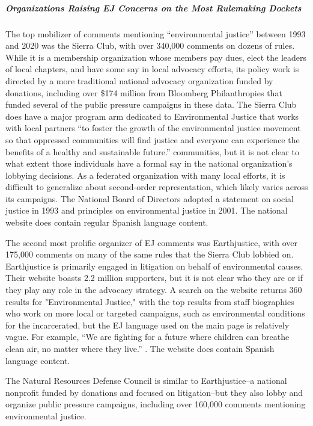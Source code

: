 \documentclass[
      12pt,
        ]{article}
\begin{document}
\hypertarget{organizations-raising-ej-concerns-on-the-most-rulemaking-dockets}{%
\subparagraph{Organizations Raising EJ Concerns on the Most Rulemaking Dockets}\label{organizations-raising-ej-concerns-on-the-most-rulemaking-dockets}}

The top mobilizer of comments mentioning ``environmental justice'' between 1993 and 2020 was the Sierra Club, with over 340,000 comments on dozens of rules. While it is a membership organization whose members pay dues, elect the leaders of local chapters, and have some say in local advocacy efforts, its policy work is directed by a more traditional national advocacy organization funded by donations, including over \$174 million from Bloomberg Philanthropies that funded several of the public pressure campaigns in these data. The Sierra Club does have a major program arm dedicated to Environmental Justice that works with local partners ``to foster the growth of the environmental justice movement so that oppressed communities will find justice and everyone can experience the benefits of a healthy and sustainable future.'' communities, but it is not clear to what extent those individuals have a formal say in the national organization's lobbying decisions. As a federated organization with many local efforts, it is difficult to generalize about second-order representation, which likely varies across its campaigns. The National Board of Directors adopted a statement on social justice in 1993 and principles on environmental justice in 2001. The national website does contain regular Spanish language content.

The second most prolific organizer of EJ comments was Earthjustice, with over 175,000 comments on many of the same rules that the Sierra Club lobbied on. Earthjustice is primarily engaged in litigation on
behalf of environmental causes. Their website boasts 2.2 million
supporters, but it is not clear who they are or if they play any role in
the advocacy strategy. A search on the website returns 360 results for
"Environmental Justice," with the top results from staff biographies
who work on more local or targeted campaigns, such as environmental conditions
for the incarcerated, but the EJ language used on the
main page is relatively vague. For example, ``We are fighting for a future
where children can breathe clean air, no matter where they live.''
\citep{Earthjustice2017}. The website does contain Spanish language content.

The Natural Resources Defense Council is similar to Earthjustice--a
national nonprofit funded by donations and focused on litigation--but
they also lobby and organize public pressure campaigns, including over 160,000 comments mentioning environmental justice.
\end{document}
